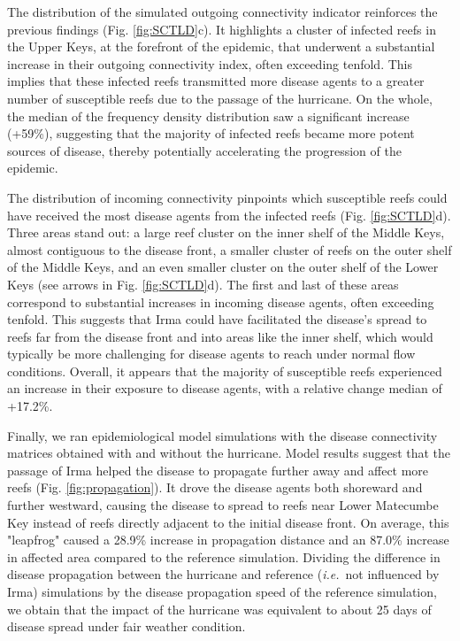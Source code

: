 \documentclass[fleqn,10pt]{wlscirep}
\newcommand{\modif}[1]{{#1}}
\newcommand{\ie}{{\it i.e.}\ }
\begin{document}
The distribution of the simulated outgoing connectivity indicator reinforces the previous findings (Fig. \ref{fig:SCTLD}c). It highlights a cluster of infected reefs in the Upper Keys, at the forefront of the epidemic, that underwent a substantial increase in their outgoing connectivity index, often exceeding tenfold. This implies that these infected reefs transmitted more disease agents to a greater number of susceptible reefs due to the passage of the hurricane. On the whole, the median of the frequency density distribution saw a significant increase (+59\%), suggesting that the majority of infected reefs became more potent sources of disease, thereby \modif{potentially} accelerating the progression of the epidemic.

The distribution of incoming connectivity pinpoints which susceptible reefs could have received the most disease agents from the infected reefs (Fig. \ref{fig:SCTLD}d). Three areas stand out: a large reef cluster on the inner shelf of the Middle Keys, almost contiguous to the disease front, a smaller cluster of reefs on the outer shelf of the Middle Keys, and an even smaller cluster on the outer shelf of the Lower Keys (see arrows in Fig. \ref{fig:SCTLD}d). The first and last of these areas correspond to substantial increases in incoming disease agents, often exceeding tenfold. This suggests that Irma \modif{could have} facilitated the disease's spread to reefs far from the disease front and into areas like the inner shelf, which would typically be more challenging for disease agents to reach under normal flow conditions. Overall, it appears that the majority of susceptible reefs experienced an increase in their exposure to disease agents, with a relative change median of +17.2\%.

Finally, we ran epidemiological model simulations with the disease connectivity matrices obtained with and without the hurricane. Model results suggest that the passage of Irma helped the disease to
propagate further away and affect more reefs (Fig. \ref{fig:propagation}). It drove the disease agents both shoreward and further westward, causing the disease to spread to reefs near Lower Matecumbe Key instead of reefs directly adjacent to the initial disease front. On average, this "leapfrog" caused a 28.9\% increase in propagation distance and an 87.0\% \modif{increase} in affected area compared to the reference simulation. Dividing the difference in disease propagation between the hurricane and reference (\ie not influenced by Irma) simulations by the disease propagation speed of the reference simulation, we obtain that the impact of the hurricane was equivalent to about 25 days of disease spread under fair weather condition.
\end{document}
